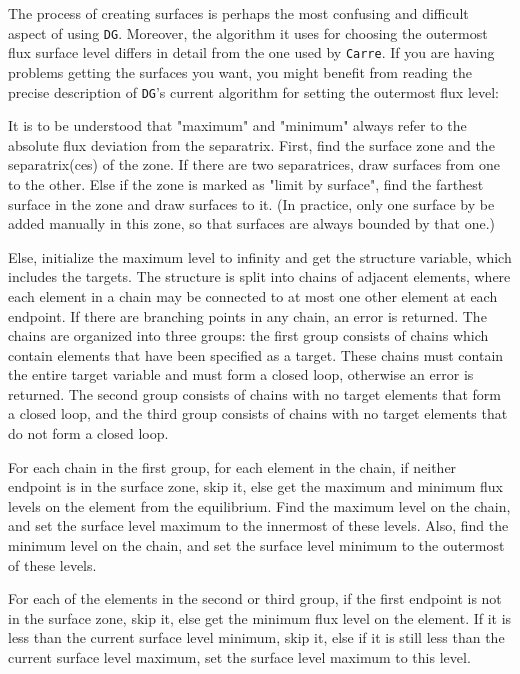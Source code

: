 \documentclass[a4paper,10pt]{report}
\begin{document}

The process of creating surfaces is perhaps the most confusing and difficult
aspect of using {\tt DG}.  Moreover, the algorithm it uses for choosing the
outermost flux surface level differs in detail from the one used by
{\tt Carre}.  If you are having problems getting the surfaces you want,
you might benefit from reading the precise description of {\tt DG}'s
current algorithm for setting the outermost flux level:

It is to be understood that "maximum" and "minimum"
always refer to the absolute flux deviation from the separatrix.
First, find the surface zone and the separatrix(ces) of the zone. If
there are two separatrices, draw surfaces from one to the other. Else
if the zone is marked as "limit by surface", find the farthest surface
in the zone and draw surfaces to it.  (In practice, only one surface
by be added manually in this zone, so that surfaces are always bounded
by that one.)

Else, initialize the maximum level to infinity and get the structure
variable, which includes the targets.  The structure is split into
chains of adjacent elements, where each element in a chain may be
connected to at most one other element at each endpoint.  If there are
branching points in any chain, an error is returned.  The chains are
organized into three groups: the first group consists of chains which
contain elements that have been specified as a target.  These chains
must contain the entire target variable and must form a closed loop,
otherwise an error is returned.  The second group consists of chains
with no target elements that form a closed loop, and the third group
consists of chains with no target elements that do not form a closed
loop.

For each chain in the first group, for each element in the chain, if
neither endpoint is in the surface zone, skip it, else get the maximum
and minimum flux levels on the element from the equilibrium.  Find the
maximum level on the chain, and set the surface level maximum to the
innermost of these levels.  Also, find the minimum level on the chain,
and set the surface level minimum to the outermost of these levels.

For each of the elements in the second or third group, if the first
endpoint is not in the surface zone, skip it, else get the minimum
flux level on the element.  If it is less than the current surface
level minimum, skip it, else if it is still less than the current
surface level maximum, set the surface level maximum to this level.
\end{document}
